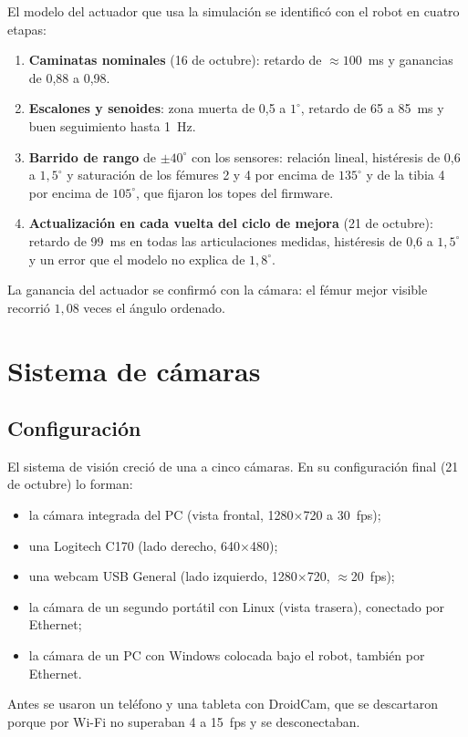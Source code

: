 El modelo del actuador que usa la simulación se identificó con el robot en cuatro
etapas:
\begin{enumerate}
    \item \textbf{Caminatas nominales} (16 de octubre): retardo de $\approx100$~ms
    y ganancias de 0,88 a 0,98.
    \item \textbf{Escalones y senoides}: zona muerta de 0,5 a $1^\circ$, retardo
    de 65 a 85~ms y buen seguimiento hasta 1~Hz.
    \item \textbf{Barrido de rango} de $\pm40^\circ$ con los sensores: relación
    lineal, histéresis de 0,6 a $1{,}5^\circ$ y saturación de los fémures 2 y 4
    por encima de $135^\circ$ y de la tibia 4 por encima de $105^\circ$, que
    fijaron los topes del firmware.
    \item \textbf{Actualización en cada vuelta del ciclo de mejora}
    (21 de octubre): retardo de 99~ms en todas las articulaciones medidas,
    histéresis de 0,6 a $1{,}5^\circ$ y un error que el modelo no explica de
    $1{,}8^\circ$.
\end{enumerate}
La ganancia del actuador se confirmó con la cámara: el fémur mejor visible
recorrió $1{,}08$ veces el ángulo ordenado.

\section{Sistema de cámaras}

\subsection{Configuración}

El sistema de visión creció de una a cinco cámaras. En su configuración final
(21 de octubre) lo forman:
\begin{itemize}
    \item la cámara integrada del PC (vista frontal, 1280$\times$720 a 30~fps);
    \item una Logitech C170 (lado derecho, 640$\times$480);
    \item una webcam USB General (lado izquierdo, 1280$\times$720, $\approx$20~fps);
    \item la cámara de un segundo portátil con Linux (vista trasera), conectado
    por Ethernet;
    \item la cámara de un PC con Windows colocada bajo el robot, también por
    Ethernet.
\end{itemize}
Antes se usaron un teléfono y una tableta con DroidCam, que se descartaron
porque por Wi-Fi no superaban 4 a 15~fps y se desconectaban.

